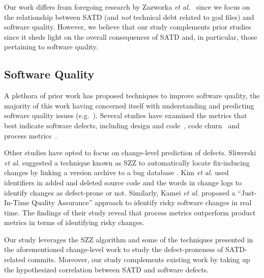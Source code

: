 Our work differs from foregoing research by Zazworka {\em et al.}~\cite{zazworka2011investigating,Zazworka:2013} since we focus on the relationship between SATD (and \textit{not} technical debt related to god files) and software quality. However, we believe that our study complements prior studies since it sheds light on the overall consequences of SATD and, in particular, those pertaining to software quality.

\subsection{Software Quality}

A plethora of prior work has proposed techniques to improve software quality, the majority of this work having concerned itself with understanding and predicting software quality issues (e.g.~\cite{Zimmerman2008Springer}). Several studies have examined the metrics that best indicate software defects, including design and code~\cite{Jiang-promise-2008}, code churn~\cite{Nagappan-icse-2005} and process metrics~\cite{Moser-icse-2008,Rahman-icse-2013}.


Other studies have opted to focus on change-level prediction of defects. Sliwerski  \emph{et al.} suggested a technique known as SZZ to automatically locate fix-inducing changes by linking a version archive to a bug database \cite{Sliwerski-fse-2005}.   Kim \emph{et al.} \cite{Kim-tse-2008} used identifiers in added and deleted source code and the words in change logs to identify changes as defect-prone or not. Similarly,  Kamei \cite{Kamei-tse-2013} \textit{et al.} proposed a  ``Just-In-Time Quality Assurance''  approach to identify risky software changes in real time.  The findings of their study reveal that process metrics outperform product metrics in terms of identifying risky changes.

Our study leverages the SZZ algorithm and some of the techniques presented in the aforementioned change-level work to study the defect-proneness of SATD-related commits. Moreover, our study complements existing work by taking up the hypothesized correlation between SATD and software defects.

